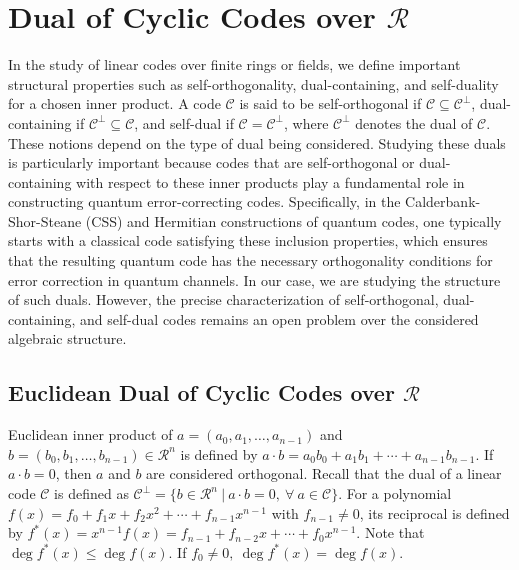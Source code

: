 \documentclass{amsart}
\theoremstyle{definition}
\theoremstyle{remark}
\numberwithin{equation}{section}
\begin{document}
    \section{Dual of  Cyclic Codes over $\mathcal{R}$}

   In the study of linear codes over finite rings or fields, we define important structural properties such as self-orthogonality, dual-containing, and self-duality for a chosen inner product. A code $\mathcal{C}$ is said to be self-orthogonal if $\mathcal{C} \subseteq \mathcal{C}^\perp$, dual-containing if $\mathcal{C}^\perp \subseteq \mathcal{C}$, and self-dual if $\mathcal{C} = \mathcal{C}^\perp$, where $\mathcal{C}^\perp$ denotes the dual of $\mathcal{C}$. These notions depend on the type of dual being considered. Studying these duals is particularly important because codes that are self-orthogonal or dual-containing with respect to these inner products play a fundamental role in constructing quantum error-correcting codes. Specifically, in the Calderbank-Shor-Steane (CSS) and Hermitian constructions of quantum codes, one typically starts with a classical code satisfying these inclusion properties, which ensures that the resulting quantum code has the necessary orthogonality conditions for error correction in quantum channels. In our case, we are studying the structure of such duals. However, the precise characterization of self-orthogonal, dual-containing, and self-dual codes remains an open problem over the considered algebraic structure.
\subsection{Euclidean Dual of  Cyclic Codes over $\mathcal{R}$  }
 Euclidean inner product of $a = (a_0,a_1,\dots,a_{n-1})$ and $ b=(b_0,b_1,\dots,b_{n-1}) \in \mathcal{R}^{n}$ is defined by $ a\cdot b = a_0b_0 + a_1b_1 + \cdots + a_{n-1}b_{n-1}  $. If $ a\cdot b = 0$, then $a$ and $b$ are considered orthogonal. Recall that the dual of a linear code $\mathcal{C}$ is defined as $ \mathcal{C}^\perp = \{ b \in \mathcal{R}^n ~|~ a\cdot b =0, ~ \forall~ a \in \mathcal{C} \} $. For a polynomial $ f(x) = f_0 + f_1x + f_2x^2 + \cdots + f_{n-1}x^{n-1} $ with $ f_{n-1} \neq 0 $, its reciprocal is defined by $ f^*(x) = x^{n-1}f(x) = f_{n-1} + f_{n-2}x + \cdots + f_0x^{n-1} $. Note that $ \deg{f^*(x)} \leq \deg{f(x)} $. If $f_0 \neq 0,  ~\deg{f^*(x) = \deg{f(x)}} $.
     
\end{document}
